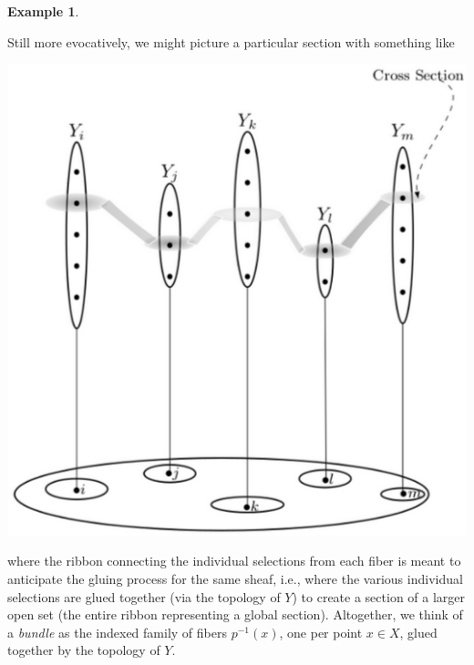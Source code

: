 \documentclass[11pt]{book}
\theoremstyle{definition}
\newtheorem{example}{Example}[section]
\theoremstyle{definition}
\theoremstyle{definition}
\theoremstyle{theorem}
\theoremstyle{definition}
\begin{document}
\begin{example}
\begin{center}
\end{center}
Still more evocatively, we might picture a particular section with something like 
\begin{center}
	\includegraphics[scale=0.35]{CrossSectionBW.png}
\end{center}
where the ribbon connecting the individual selections from each fiber is meant to anticipate the gluing process for the same sheaf, i.e., where the various individual selections are glued together (via the topology of $Y$) to create a section of a larger open set (the entire ribbon representing a global section). Altogether, we think of a \textit{bundle} as the indexed family of fibers $p^{-1}(x)$, one per point $x \in X$, glued together by the topology of $Y$. 

\end{example}
\end{document}
